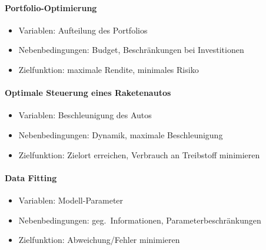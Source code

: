	\paragraph{Portfolio-Optimierung}
	\begin{itemize}
		\item Variablen: Aufteilung des Portfolios
		\item Nebenbedingungen: Budget, Beschr\"ankungen bei Investitionen
		\item Zielfunktion: maximale Rendite, minimales Risiko
	\end{itemize}
	\paragraph{Optimale Steuerung eines Raketenautos}
	\begin{itemize}
		\item Variablen: Beschleunigung des Autos
		\item Nebenbedingungen: Dynamik, maximale Beschleunigung
		\item Zielfunktion: Zielort erreichen, Verbrauch an Treibstoff minimieren
	\end{itemize}
	\paragraph{Data Fitting}
	\begin{itemize}
		\item Variablen: Modell-Parameter
		\item Nebenbedingungen: geg.\ Informationen, Parameterbeschr\"ankungen
		\item Zielfunktion: Abweichung/Fehler minimieren
	\end{itemize}
	
